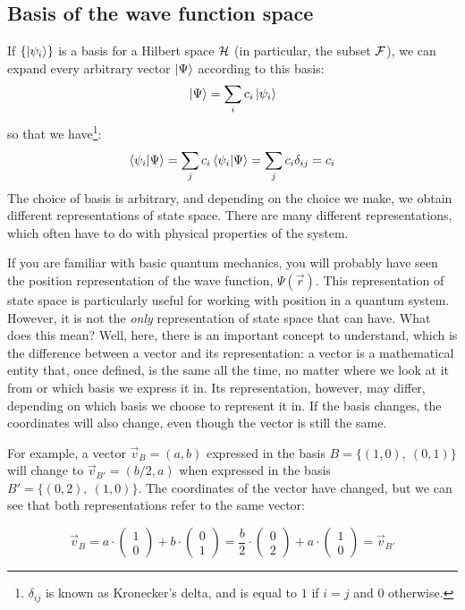 \subsection{Basis of the wave function space}

If $\{\ket{\psi_i}\}$ is a basis for a Hilbert space $\mathcal{H}$ (in particular, the subset $\mathcal{F}$), we can expand every arbitrary vector $\ket{\Psi}$ according to this basis:
\begin{equation}
    \ket{\Psi} = \sum_i c_i \ket{\psi_i}
\end{equation}
so that we have\footnote{$\delta_{ij}$ is known as Kronecker's delta, and is equal to $1$ if $i=j$ and $0$ otherwise.}:
\begin{equation}
    \braket{\psi_i|\Psi} = \sum_j c_i \braket{\psi_i|\Psi} = \sum_j c_i\delta_{ij} = c_i
\end{equation}
The choice of basis is arbitrary, and depending on the choice we make, we obtain different representations of state space. There are many different representations, which often have to do with physical properties of the system. 

If you are familiar with basic quantum mechanics, you will probably have seen the position representation of the wave function, $\Psi\left(\vec{r}\right)$. This representation of state space is particularly useful for working with position in a quantum system. However, it is not the \textit{only} representation of state space that can have. What does this mean? Well, here, there is an important concept to understand, which is the difference between a vector and its representation: a vector is a mathematical entity that, once defined, is the same all the time, no matter where we look at it from or which basis we express it in. Its representation, however, may differ, depending on which basis we choose to represent it in. If the basis changes, the coordinates will also change, even though the vector is still the same.

For example, a vector $\vec{v}_B = (a, b)$ expressed in the basis $B=\{(1, 0),\ (0, 1)\}$ will change to $\vec{v}_{B'} = (b/2, a)$ when expressed in the basis $B'=\{(0, 2),\ (1, 0)\}$. The coordinates of the vector have changed, but we can see that both representations refer to the same vector:

\begin{equation}
    \vec{v}_B = a\cdot \begin{pmatrix}
        1 \\ 0
    \end{pmatrix} + b \cdot \begin{pmatrix}
        0 \\ 1
    \end{pmatrix} = 
    \frac{b}{2}\cdot \begin{pmatrix}
        0 \\ 2
    \end{pmatrix} + a \cdot \begin{pmatrix}
        1 \\ 0
    \end{pmatrix} = \vec{v}_{B'}
\end{equation}

